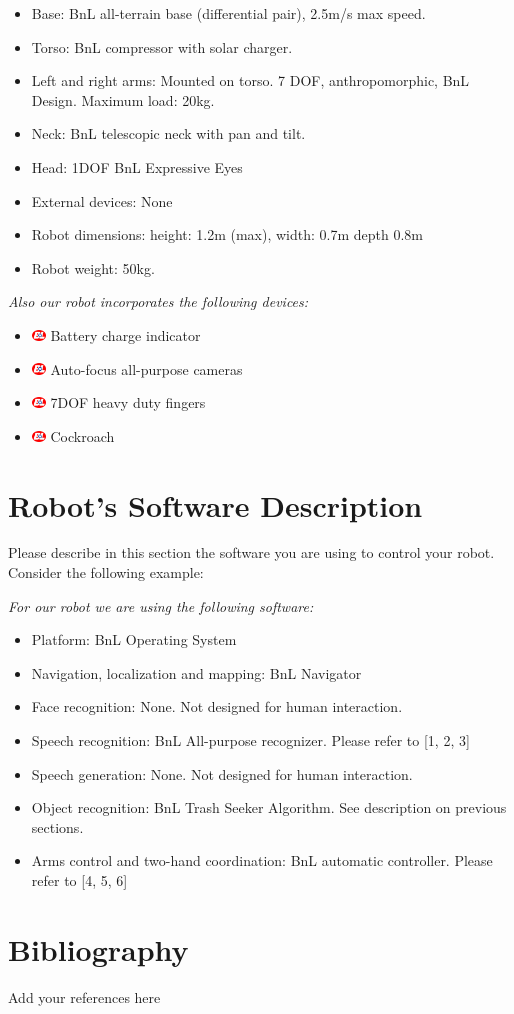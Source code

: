 \documentclass[runningheads,a4paper]{llncs}
\newcommand{\BnL}[1][1em]{ \includegraphics[width=#1]{images/bnl.jpg} }
\begin{document}
\begin{itemize}
	\item Base: BnL all-terrain base (differential pair), 2.5m/s max speed.
	\item Torso: BnL compressor with solar charger.
	\item Left and right arms: Mounted on torso. 7 DOF, anthropomorphic, BnL Design. Maximum load: 20kg.
	\item Neck: BnL telescopic neck with pan and tilt.
	\item Head: 1DOF BnL Expressive Eyes
	\item External devices: None
	\item Robot dimensions: height: 1.2m (max), width: 0.7m depth 0.8m
	\item Robot weight: 50kg.
\end{itemize}

\textit{Also our robot incorporates the following devices:}

\begin{itemize}
	\item \BnL Battery charge indicator
	\item \BnL Auto-focus all-purpose cameras
	\item \BnL 7DOF heavy duty fingers
	\item \BnL Cockroach
\end{itemize}

\section*{Robot's Software Description}
Please describe in this section the software you are using to control your robot.
Consider the following example:

\textit{For our robot we are using the following software:}

\begin{itemize}
	\item Platform: BnL Operating System
	\item Navigation, localization and mapping: BnL Navigator
	\item Face recognition: None. Not designed for human interaction.
	\item Speech recognition: BnL All-purpose recognizer. Please refer to [1, 2, 3]
	\item Speech generation: None. Not designed for human interaction.
	\item Object recognition: BnL Trash Seeker Algorithm. See description on previous sections.
	\item Arms control and two-hand coordination: BnL automatic controller. Please refer to [4, 5, 6]
\end{itemize}

\section*{Bibliography}
Add your references here
%
%
\end{document}
